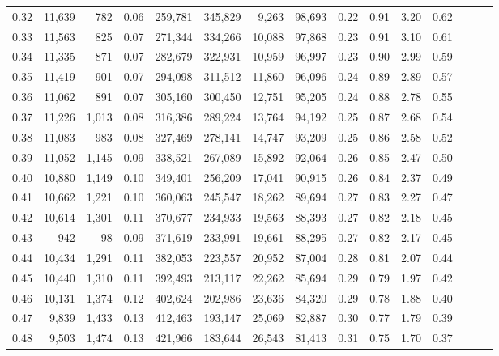 \begin{tabular}{rrrrrrrrrrrrrrr}
0.32 &  11,639 &    782 &  0.06 &  259,781 &  345,829 &    9,263 &   98,693 &  0.22 &  0.91 &  3.20 &      0.62 \\
0.33 &  11,563 &    825 &  0.07 &  271,344 &  334,266 &   10,088 &   97,868 &  0.23 &  0.91 &  3.10 &      0.61 \\
0.34 &  11,335 &    871 &  0.07 &  282,679 &  322,931 &   10,959 &   96,997 &  0.23 &  0.90 &  2.99 &      0.59 \\
0.35 &  11,419 &    901 &  0.07 &  294,098 &  311,512 &   11,860 &   96,096 &  0.24 &  0.89 &  2.89 &      0.57 \\
0.36 &  11,062 &    891 &  0.07 &  305,160 &  300,450 &   12,751 &   95,205 &  0.24 &  0.88 &  2.78 &      0.55 \\
0.37 &  11,226 &  1,013 &  0.08 &  316,386 &  289,224 &   13,764 &   94,192 &  0.25 &  0.87 &  2.68 &      0.54 \\
0.38 &  11,083 &    983 &  0.08 &  327,469 &  278,141 &   14,747 &   93,209 &  0.25 &  0.86 &  2.58 &      0.52 \\
0.39 &  11,052 &  1,145 &  0.09 &  338,521 &  267,089 &   15,892 &   92,064 &  0.26 &  0.85 &  2.47 &      0.50 \\
0.40 &  10,880 &  1,149 &  0.10 &  349,401 &  256,209 &   17,041 &   90,915 &  0.26 &  0.84 &  2.37 &      0.49 \\
0.41 &  10,662 &  1,221 &  0.10 &  360,063 &  245,547 &   18,262 &   89,694 &  0.27 &  0.83 &  2.27 &      0.47 \\
0.42 &  10,614 &  1,301 &  0.11 &  370,677 &  234,933 &   19,563 &   88,393 &  0.27 &  0.82 &  2.18 &      0.45 \\
0.43 &     942 &     98 &  0.09 &  371,619 &  233,991 &   19,661 &   88,295 &  0.27 &  0.82 &  2.17 &      0.45 \\
0.44 &  10,434 &  1,291 &  0.11 &  382,053 &  223,557 &   20,952 &   87,004 &  0.28 &  0.81 &  2.07 &      0.44 \\
0.45 &  10,440 &  1,310 &  0.11 &  392,493 &  213,117 &   22,262 &   85,694 &  0.29 &  0.79 &  1.97 &      0.42 \\
0.46 &  10,131 &  1,374 &  0.12 &  402,624 &  202,986 &   23,636 &   84,320 &  0.29 &  0.78 &  1.88 &      0.40 \\
0.47 &   9,839 &  1,433 &  0.13 &  412,463 &  193,147 &   25,069 &   82,887 &  0.30 &  0.77 &  1.79 &      0.39 \\
0.48 &   9,503 &  1,474 &  0.13 &  421,966 &  183,644 &   26,543 &   81,413 &  0.31 &  0.75 &  1.70 &      0.37 \\

\end{tabular}
